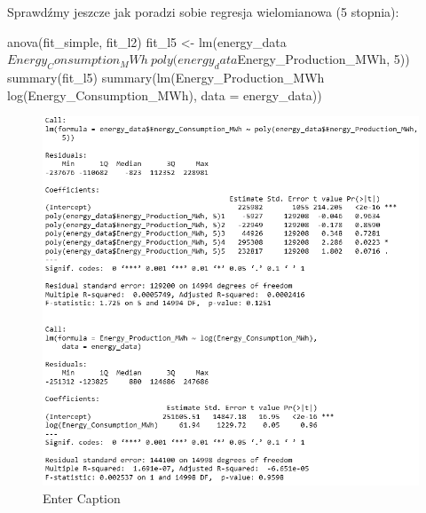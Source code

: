 Sprawdźmy jeszcze jak poradzi sobie regresja wielomianowa (5 stopnia):

\begin{Rcode}
anova(fit_simple, fit_l2)
fit_l5 <- lm(energy_data$Energy_Consumption_MWh ~ poly(energy_data$Energy_Production_MWh, 5))
summary(fit_l5)
summary(lm(Energy_Production_MWh ~ log(Energy_Consumption_MWh), data = energy_data))
\end{Rcode}

\begin{figure}[H]
    \centering
    \includegraphics[width=1\linewidth]{lab1/obraz14.png}
    \caption{Enter Caption}
    \label{fig:enter-label}
\end{figure}